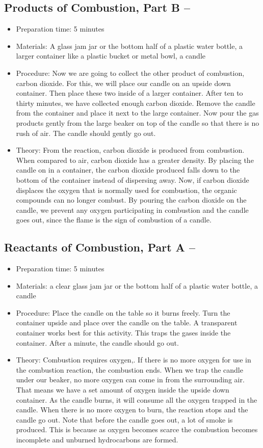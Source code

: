\subsection{Products of Combustion, Part B – \texorpdfstring{}{CO2}}
\begin{itemize}
\item{Preparation time: 5 minutes}
\item{Materials: A glass jam jar or the bottom half of a plastic water bottle, a larger container like a plastic bucket or metal bowl, a candle}
\item{Procedure: Now we are going to collect the other product of combustion, carbon dioxide. For this, we will place our candle on an upside down container. Then place these two inside of a larger container. After ten to thirty minutes, we have collected enough carbon dioxide. Remove the candle from the container and place it next to the large container. Now pour the gas products gently from the large beaker on top of the candle so that there is no rush of air. The candle should gently go out.}
\item{Theory: From the reaction, carbon dioxide is produced from combustion. When compared to air, carbon dioxide has a greater density. By placing the candle on in a container, the carbon dioxide produced falls down to the bottom of the container instead of dispersing away. Now, if carbon dioxide displaces the oxygen that is normally used for combustion, the organic compounds can no longer combust. By pouring the carbon dioxide on the candle, we prevent any oxygen participating in combustion and the candle goes out, since the flame is the sign of combustion of a candle.}
\end{itemize}

\subsection{Reactants of Combustion, Part A – \texorpdfstring{}{O2}}
\begin{itemize}
\item{Preparation time: 5 minutes}
\item{Materials: a clear glass jam jar or the bottom half of a plastic water bottle, a candle}
\item{Procedure: Place the candle on the table so it burns freely. Turn the container upside and place over the candle on the table. A transparent container works best for this activity. This traps the gases inside the container. After a minute, the candle should go out.}
\item{Theory:  Combustion requires oxygen,. If there is no more oxygen for use in the combustion reaction, the combustion ends. When we trap the candle under our beaker, no more oxygen can come in from the surrounding air. That means we have a set amount of oxygen inside the upside down container. As the candle burns, it will consume all the oxygen trapped in the candle. When there is no more oxygen to burn, the reaction stops and the candle go out. Note that before the candle goes out, a lot of smoke is produced. This is because as oxygen becomes scarce the combustion becomes incomplete and unburned hydrocarbons are formed.}
\end{itemize}

